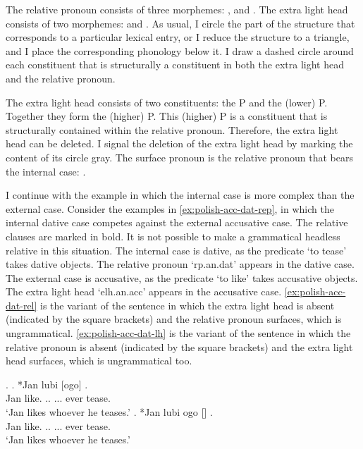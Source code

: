 The relative pronoun consists of three morphemes: ,  and .
The extra light head consists of two morphemes:  and .
As usual, I circle the part of the structure that corresponds to a particular lexical entry, or I reduce the structure to a triangle, and I place the corresponding phonology below it.
I draw a dashed circle around each constituent that is structurally a constituent in both the extra light head and the relative pronoun.

The extra light head consists of two constituents: the P and the (lower) P. Together they form the (higher) P.
This (higher) P is a constituent that is structurally contained within the relative pronoun. Therefore, the extra light head can be deleted. I signal the deletion of the extra light head by marking the content of its circle gray.
The surface pronoun is the relative pronoun that bears the internal case: .

I continue with the example in which the internal case is more complex than the external case.
Consider the examples in \ref{ex:polish-acc-dat-rep}, in which the internal dative case competes against the external accusative case. The relative clauses are marked in bold. It is not possible to make a grammatical headless relative in this situation.
The internal case is dative, as the predicate  `to tease' takes dative objects. The relative pronoun  `\ac{rp}.\ac{an}.\ac{dat}' appears in the dative case.
The external case is accusative, as the predicate  `to like' takes accusative objects. The extra light head  `\ac{elh}.\ac{an}.\ac{acc}' appears in the accusative case.
\ref{ex:polish-acc-dat-rel} is the variant of the sentence in which the extra light head is absent (indicated by the square brackets) and the relative pronoun surfaces, which is ungrammatical.
\ref{ex:polish-acc-dat-lh} is the variant of the sentence in which the relative pronoun is absent (indicated by the square brackets) and the extra light head surfaces, which is ungrammatical too.

\ex.\label{ex:polish-acc-dat-rep}
\ag. *Jan lubi [ogo]   .\\
Jan like.\scsub{[acc]} .. ... ever tease.\scsub{[dat]}\\
`Jan likes whoever he teases.' \label{ex:polish-acc-dat-rel}
\bg. *Jan lubi ogo []  .\\
Jan like.\scsub{[acc]} .. ... ever tease.\scsub{[dat]}\\
`Jan likes whoever he teases.' \label{ex:polish-acc-dat-lh}

